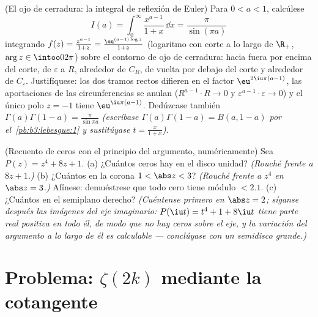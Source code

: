 \begin{exercise}[$\star\star\star$]\label{exo:b3:residues:11}
(El ojo de cerradura: la integral de reflexión de Euler) Para
$0 < a < 1$, calcúlese
\[
I(a) = \int_0^{\infty}\frac{x^{a-1}}{1 + x}\,\dd x =
\frac{\pi}{\sin(\pi a)}
\]
integrando $f(z) = \frac{z^{a-1}}{1+z} =
\frac{\eu^{(a-1)\log z}}{1 + z}$ (logaritmo con corte a lo largo de
$\R_+$, $\arg z \in \intoo0{2\pi}$) sobre el contorno de ojo de
cerradura: hacia fuera por encima del corte, de $\varepsilon$ a $R$,
alrededor de $C_R$, de vuelta por debajo del corte y alrededor de
$C_\varepsilon$. Justifíquese: los dos tramos rectos difieren en el
factor $\eu^{2\iu\pi(a-1)}$, las aportaciones de las circunferencias se
anulan ($R^{a-1}\cdot R \to 0$ y
$\varepsilon^{a-1}\cdot\varepsilon \to 0$) y el único polo $z = -1$
tiene 
$\eu^{\iu\pi(a - 1)}$. Dedúzcase también
$\Gamma(a)\Gamma(1 - a) = \frac\pi{\sin\pi a}$ \emph{(escríbase
$\Gamma(a)\Gamma(1-a) = B(a, 1-a)$ por el~\cref{pb:b3:lebesgue:1} y
sustitúyase $t =
\frac{x}{1+x}$)}.
\end{exercise}

\begin{exercise}[$\star\star$]\label{exo:b3:residues:12}
(Recuento de ceros con el principio del argumento, numéricamente) Sea
$P(z) = z^4 + 8z + 1$. (a) ¿Cuántos ceros hay en el disco unidad?
\emph{(Rouché frente a
$8z + 1$.)}
(b) ¿Cuántos en la corona $1 < \abs z < 3$? \emph{(Rouché frente a $z^4$
en $\abs z = 3$.)} Afínese: demuéstrese que todo cero tiene módulo
$< 2.1$. (c) ¿Cuántos en el semiplano derecho? \emph{(Cuéntense primero
en $\abs z = 2$; síganse después las imágenes del eje imaginario:
$P(\iu t) = t^4 + 1 + 8\iu t$ tiene parte real positiva en todo él, de
modo que no hay ceros sobre el eje, y la variación del argumento a lo
largo de él es calculable --- conclúyase con un semidisco grande.)}
\end{exercise}

\section{Problema: \texorpdfstring{$\zeta(2k)$}{zeta(2k)} mediante la
cotangente}

